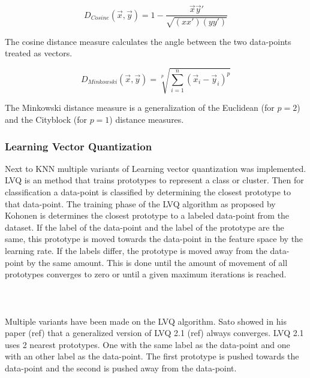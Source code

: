 \begin{equation}
D_{Cosine}(\vec{x},\vec{y})= 1 - \frac{\vec{x}\vec{y}'}{\sqrt{(xx')(yy')}}
\end{equation}

\noindent The cosine distance measure calculates the angle between the two data-points treated as vectors.

\begin{equation}
D_{Minkowski}(\vec{x},\vec{y}) = \sqrt[p]{\sum^n_{i=1}(\vec{x}_i-\vec{y}_i)^p}
\end{equation}

\noindent The Minkowski distance measure is a generalization of the Euclidean (for $p=2$) and the Cityblock (for $p=1$) distance measures.

\subsubsection{Learning Vector Quantization}


Next to KNN multiple variants of Learning vector quantization was implemented. LVQ is an method that trains prototypes to represent a class or cluster. Then for classification a data-point is classified by determining the closest prototype to that data-point. The training phase of the LVQ algorithm as proposed by Kohonen is determines the closest prototype to a labeled data-point from the dataset. If the label of the data-point and the label of the prototype are the same, this prototype is moved towards the data-point in the feature space by the learning rate. If the labels differ, the prototype is moved away from the data-point by the same amount. This is done until the amount of movement of all prototypes converges to zero or until a given maximum iterations is reached.
\\\\
\\\\
Multiple variants have been made on the LVQ algorithm. Sato showed in his paper (ref)  that a generalized version of LVQ 2.1 (ref)  always converges. LVQ 2.1 uses 2 nearest prototypes. One with the same label as the data-point and one with an other label as the data-point. The first prototype is pushed towards the data-point and the second is pushed away from the data-point.


